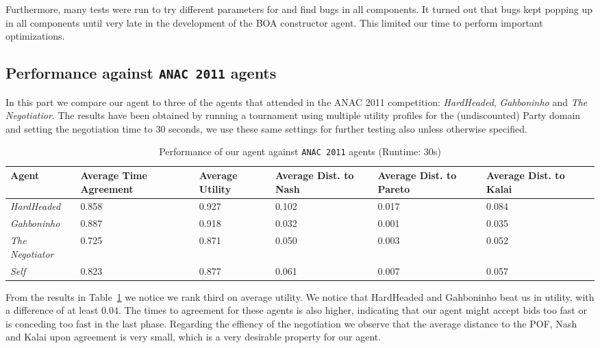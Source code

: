 Furthermore, many tests were run to try different parameters for and find bugs in all components. It turned out that bugs kept popping up in all components until very late in the development of the BOA constructor agent. This limited our time to perform important optimizations.

\subsection{Performance against \texttt{ANAC 2011} agents}

In this part we compare our agent to three of the agents that attended in the ANAC 2011 competition: \emph{HardHeaded}, \emph{Gahboninho} and \emph{The Negotiatior}. The results have been obtained by running a tournament using multiple utility profiles for the (undiscounted) Party domain and setting the negotiation time to $30$ seconds,
we use these same settings for further testing also unless otherwise specified. 

\begin{table}[H]
	\centering
	\small
    \begin{tabular}{m{2cm}m{2cm}m{2cm}m{2cm}m{2cm}m{2cm}m{2cm}}
    \toprule
    Agent                       & Average Time Agreement & Average Utility & Average Dist. to Nash & Average Dist. to Pareto & Average Dist. to Kalai \\
    \midrule
    \emph{HardHeaded}		& 0.858  & 0.927  & 0.102  & 0.017  & 0.084   \\ 
    \emph{Gahboninho}   	& 0.887  & 0.918  & 0.032  & 0.001  & 0.035   \\ 
    \emph{The Negotiator} 	& 0.725  & 0.871  & 0.050  & 0.003  & 0.052   \\ 
    \emph{Self}                 & 0.823  & 0.877  & 0.061  & 0.007  & 0.057   \\
    \bottomrule
    \end{tabular}
    \caption{Performance of our agent against \texttt{ANAC 2011} agents (Runtime: $30$s) \label{table:anac2011-results}}
\end{table}

From the results in Table~\ref{table:anac2011-results} we notice we rank third on average utility. 
We notice that HardHeaded and Gahboninho beat us in utility, with a difference of at least $0.04$. The times to agreement for these agents is also higher,
indicating that our agent might accept bids too fast or is conceding too fast in the last phase.
Regarding the effiency of the negotiation we observe that the average distance to the POF, Nash and Kalai upon agreement is very small,
which is a very desirable property for our agent. 

